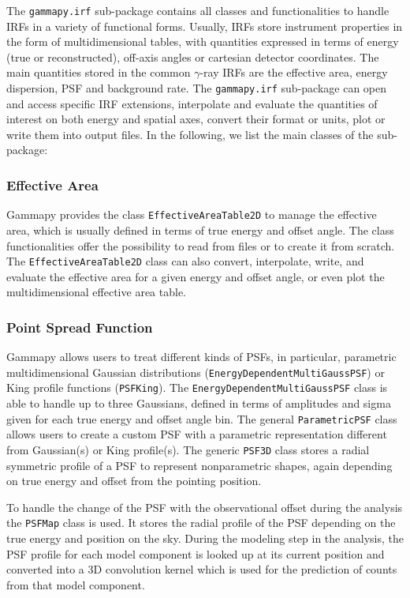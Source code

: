 \documentclass[longauth]{aa}
\newcommand{\code}[1]{\texttt{#1}}
\newcommand{\gammapy}{Gammapy\xspace}
\newcommand{\irf}{IRF\xspace}
\newcommand{\irfs}{IRFs\xspace}
\newcommand{\gammaray}{$\gamma$-ray\xspace}
\begin{document}
The \code{gammapy.irf} sub-package contains all classes and functionalities
to handle IRFs in a variety of functional forms.
Usually, \irfs store instrument properties in the form of multidimensional
tables, with quantities expressed in terms of energy (true or reconstructed),
off-axis angles or cartesian detector coordinates. The main quantities stored in
the common \gammaray \irfs are the effective area, energy dispersion,
PSF and background rate. The \code{gammapy.irf}
sub-package can open and access specific \irf extensions,
interpolate and evaluate the quantities of interest on both energy and spatial
axes, convert their format or units, plot or write them into
output files. In the following, we list the main classes of the
sub-package:

\subsubsection{Effective Area}
\gammapy provides the class \code{EffectiveAreaTable2D} to
manage the effective area, which is usually defined in terms of true energy and offset angle.
The class functionalities offer the possibility to read from files or to create
it from scratch. The \code{EffectiveAreaTable2D} class can also convert, interpolate,
write, and evaluate the effective area for a given energy and offset angle, or
even plot the multidimensional effective area table.


\subsubsection{Point Spread Function}
\gammapy allows users to treat different kinds of PSFs,
in particular, parametric multidimensional Gaussian distributions (\code{EnergyDependentMultiGaussPSF})
or King profile functions (\code{PSFKing}). The \code{EnergyDependentMultiGaussPSF}
class is able to handle up to three Gaussians, defined in terms of amplitudes and sigma given for each true energy
and offset angle bin. The general \code{ParametricPSF} class allows users to create a
custom PSF with a parametric representation different from Gaussian(s) or King profile(s).
The generic \code{PSF3D} class stores a radial symmetric profile of a
PSF to represent nonparametric shapes, again depending on true energy
and offset from the pointing position.

To handle the change of the PSF with the observational offset during the analysis 
the \code{PSFMap} class is used. It stores the radial profile of the PSF
depending on the true energy and position on the sky. During the modeling
step in the analysis, the PSF profile for each model component is 
looked up at its current position and converted into a 3D convolution kernel
which is used for the prediction of counts from that model component.
\end{document}
